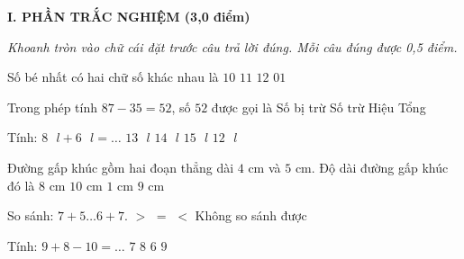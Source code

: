 
\setcounter{ex}{0}
\setcounter{bt}{0}

\textbf{\large I. PHẦN TRẮC NGHIỆM (3,0 điểm)}

{\itshape Khoanh tròn vào chữ cái đặt trước câu trả lời đúng. Mỗi câu đúng được 0,5 điểm.}

\begin{ex} %
Số bé nhất có hai chữ số khác nhau là
\choice
{\True $10$}
{$11$}
{$12$}
{$01$}
\end{ex}

\begin{ex} %
Trong phép tính $87 - 35 = 52$, số $52$ được gọi là
\choice
{Số bị trừ}
{Số trừ}
{\True Hiệu}
{Tổng}
\end{ex}

\begin{ex} %
Tính: $8\text{ }l + 6\text{ }l = \dots$
\choice
{$13\text{ }l$}
{\True $14\text{ }l$}
{$15\text{ }l$}
{$12\text{ }l$}
\end{ex}

\begin{ex} %
Đường gấp khúc gồm hai đoạn thẳng dài $4\text{ cm}$ và $5\text{ cm}$. Độ dài đường gấp khúc đó là
\choice
{$8\text{ cm}$}
{$10\text{ cm}$}
{$1\text{ cm}$}
{\True $9\text{ cm}$}
\end{ex}

\begin{ex} %
So sánh: $7 + 5 \dots 6 + 7$.
\choice
{$>$}
{$=$}
{\True $<$}
{Không so sánh được}
\end{ex}

\begin{ex} %
Tính: $9 + 8 - 10 = \dots$
\choice
{\True $7$}
{$8$}
{$6$}
{$9$}
\end{ex}

